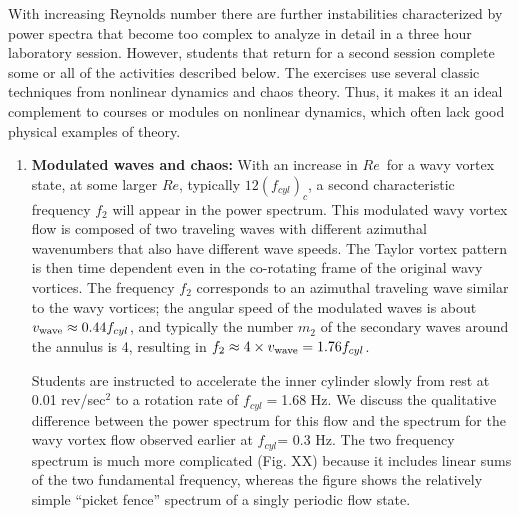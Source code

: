 \documentclass[%
reprint,
 amsmath,amssymb,
 aps,
prb,
floatfix,
longbibliography,
notitlepage
]{revtex4-1}
\newcommand{\ReN}{\ensuremath{Re}} %
\begin{document}
With increasing Reynolds number there are further instabilities characterized by power spectra that become too complex to analyze in detail in a three hour laboratory session.  However, students that return for a second session complete some or all of the activities described below. The exercises use several classic techniques from nonlinear dynamics and chaos theory. Thus, it makes it an ideal complement to courses or modules on nonlinear dynamics, which often lack good physical examples of theory.

\begin{enumerate}

\item \textbf{Modulated waves and chaos:} With an increase in \ReN\ for a wavy vortex state, at some larger \ReN, typically $12( f_{cyl})_c$, a second characteristic frequency $f_2$ will appear in the power spectrum. This modulated wavy vortex flow is composed of two traveling waves with different azimuthal wavenumbers that also have different wave speeds. The Taylor vortex pattern is then time dependent even in the co-rotating frame of the original wavy vortices.  The frequency $f_2$ corresponds to an azimuthal traveling wave similar to the wavy vortices; the angular speed of the modulated waves is about $v_{\rm wave}\approx0.44f_{cyl}$, and typically the number $m_2$ of the secondary waves around the annulus is 4, resulting in $f_2 \approx 4\times v_{\rm wave}= 1.76 f_{cyl}$.  

Students are instructed to accelerate the inner cylinder slowly from rest at 0.01 rev/sec$^2$ to a rotation rate of $f_{cyl}=$1.68 Hz. We discuss the qualitative difference between the power spectrum for this flow and the spectrum for the wavy vortex flow observed earlier at $f_{cyl}$= 0.3 Hz. The two frequency spectrum is much more complicated (Fig. XX) because it includes linear sums of the two fundamental frequency, whereas the figure shows the relatively simple ``picket fence'' spectrum of a singly periodic flow state. 




\end{enumerate}
\end{document}
